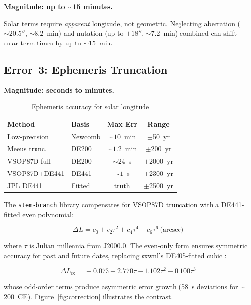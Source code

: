 \documentclass[10pt,a4paper]{article}
\begin{document}
\textbf{Magnitude: up to $\sim$15 minutes.}

Solar terms require \emph{apparent} longitude, not geometric. Neglecting
aberration ($\sim 20.5''$, $\sim 8.2$~min) and nutation (up to $\pm 18''$,
$\sim 7.2$~min) combined can shift solar term times by up to $\sim 15$~min.

\subsection{Error~3: Ephemeris Truncation}
\label{subsec:error_truncation}

\textbf{Magnitude: seconds to minutes.}

\begin{table}[H]
\centering
\caption{Ephemeris accuracy for solar longitude}
\label{tab:ephemeris}
\footnotesize
\begin{tabular}{llcc}
\toprule
\textbf{Method} & \textbf{Basis} & \textbf{Max Err} & \textbf{Range} \\
\midrule
Low-precision & Newcomb & $\sim 10$~min & $\pm$50~yr \\
Meeus trunc. & DE200 & $\sim 1.2$~min & $\pm$200~yr \\
VSOP87D full & DE200 & $\sim 24$~s & $\pm$2000~yr \\
VSOP87D+DE441 & DE441 & $\sim 1$~s & $\pm$2300~yr \\
JPL DE441 & Fitted & truth & $\pm$2500~yr \\
\bottomrule
\end{tabular}
\end{table}

The \texttt{stem-branch} library compensates for VSOP87D truncation with a
DE441-fitted even polynomial:

\begin{equation}
  \Delta L = c_0 + c_2\tau^2 + c_4\tau^4 + c_6\tau^6 ~ \text{(arcsec)}
  \label{eq:correction}
\end{equation}

\noindent where $\tau$ is Julian millennia from J2000.0. The even-only form
ensures symmetric accuracy for past and future dates, replacing sxwnl's
DE405-fitted cubic \cite{sxwnl_github}:

\begin{equation}
  \Delta L_{\text{sx}} \!=\! {-}0.073 {-} 2.770\tau {-} 1.102\tau^2 {-} 0.100\tau^3
  \label{eq:sxwnl_correction}
\end{equation}

\noindent whose odd-order terms produce asymmetric error growth (58~s
deviations for $\sim$200~CE). Figure~\ref{fig:correction} illustrates the
contrast.
\end{document}
